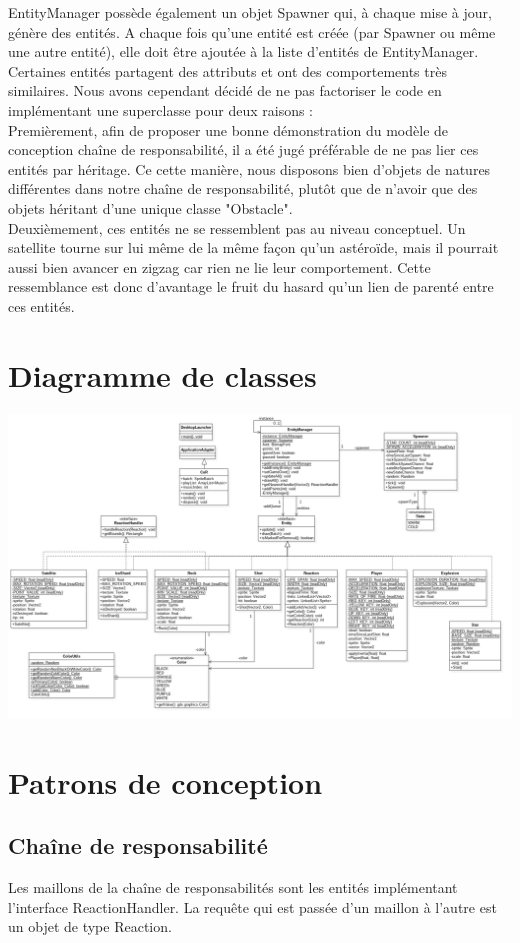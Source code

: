 \documentclass[11pt,a4paper,twoside,svgnames]{article}
\begin{document}
EntityManager possède également un objet Spawner qui, à chaque mise à jour, génère des entités. A chaque fois qu'une entité est créée (par Spawner ou même une autre entité), elle doit être ajoutée à la liste d'entités de EntityManager.\\

Certaines entités partagent des attributs et ont des comportements très similaires. Nous avons cependant décidé de ne pas factoriser le code en implémentant une superclasse pour deux raisons :\\

Premièrement, afin de proposer une bonne démonstration du modèle de conception chaîne de responsabilité, il a été jugé préférable de ne pas lier ces entités par héritage. Ce cette manière, nous disposons bien d'objets de natures différentes dans notre chaîne de responsabilité, plutôt que de n'avoir que des objets héritant d'une unique classe "Obstacle".\\

Deuxièmement, ces entités ne se ressemblent pas au niveau conceptuel. Un satellite tourne sur lui même de la même façon qu'un astéroïde, mais il pourrait aussi bien avancer en zigzag car rien ne lie leur comportement. Cette ressemblance est donc d'avantage le fruit du hasard qu'un lien de parenté entre ces entités.
\section{Diagramme de classes}
\includegraphics[scale=0.38,angle=90,origin=c]{uml_cor.jpg}
\clearpage
\section{Patrons de conception}
\subsection{Chaîne de responsabilité}
Les maillons de la chaîne de responsabilités sont les entités implémentant l'interface ReactionHandler. La requête qui est passée d'un maillon à l'autre est un objet de type Reaction.\\
\end{document}
